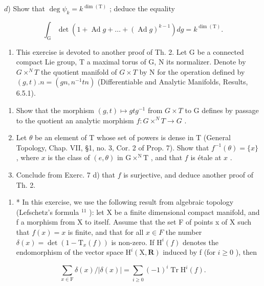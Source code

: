 \(d\)) Show that \(\deg \psi_{k} = k^{\dim (\mathrm{T})}\) ; deduce the equality

\[
\int_ {\mathrm{G}} \det (1 + \operatorname{Ad} g + \dots + (\operatorname{Ad} g) ^ {k - 1}) d g = k ^ {\dim (\mathrm{T})}.
\]

\begin{enumerate}
\def\labelenumi{\arabic{enumi})}
\setcounter{enumi}{8}
\tightlist
\item
  This exercise is devoted to another proof of Th. 2. Let G be a connected compact Lie group, T a maximal torus of G, N its normalizer. Denote by \(G \times^{N} T\) the quotient manifold of \(G \times T\) by N for the operation defined by \((g, t).n = (gn, n^{-1}tn)\) (Differentiable and Analytic Manifolds, Results, 6.5.1).
\end{enumerate}

\begin{enumerate}
\def\labelenumi{\alph{enumi})}
\item
  Show that the morphism \((g, t) \mapsto gtg^{-1}\) from \(G \times T\) to G defines by passage to the quotient an analytic morphism \(f : G \times^{N} T \to G\) .
\item
  Let \(\theta\) be an element of T whose set of powers is dense in T (General Topology, Chap. VII, §1, no. 3, Cor. 2 of Prop. 7). Show that \(f^{-1}(\theta) = \{x\}\) , where \(x\) is the class of \((e,\theta)\) in \(\mathrm{G} \times^{\mathrm{N}}\mathrm{T}\) , and that \(f\) is étale at \(x\) .
\item
  Conclude from Exerc. 7 d) that \(f\) is surjective, and deduce another proof of Th. 2.
\end{enumerate}

\begin{enumerate}
\def\labelenumi{\arabic{enumi})}
\setcounter{enumi}{9}
\tightlist
\item
  * In this exercise, we use the following result from algebraic topology (Lefschetz's formula \(^{11}\) ): let X be a finite dimensional compact manifold, and f a morphism from X to itself. Assume that the set F of points x of X such that \(f(x) = x\) is finite, and that for all \(x \in F\) the number \(\delta(x) = \det(1 - \mathrm{T}_{x}(f))\) is non-zero. If \(\mathrm{H}^{i}(f)\) denotes the endomorphism of the vector space \(\mathrm{H}^{i}(\mathrm{X}, \mathbf{R})\) induced by f (for \(i \geq 0\) ), then
\end{enumerate}

\[
\sum_ {x \in \mathrm{F}} \delta (x) / | \delta (x) | = \sum_ {i \geq 0} (- 1) ^ {i} \operatorname{Tr} \mathrm{H} ^ {i} (f).
\]

